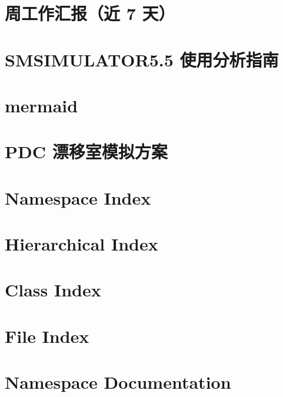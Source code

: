 \let\mypdfximage\pdfximage\def\pdfximage{\immediate\mypdfximage}\documentclass[twoside]{book}
\newcommand{\+}{\discretionary{\mbox{\scriptsize$\hookleftarrow$}}{}{}}
\begin{document}
\chapter{周工作汇报（近 7 天）}
\label{md__home_tbt_workspace_dpol_smsimulator5_85_d_work_WORK_REPORT_WEEK250828}

\chapter{S\+M\+S\+I\+M\+U\+L\+A\+T\+O\+R5.5 使用分析指南}
\label{md__home_tbt_workspace_dpol_smsimulator5_85_doc_smsimulator5_85_analysis_guide}

\chapter{mermaid}
\label{md__home_tbt_workspace_dpol_smsimulator5_85_doc_try_mermaid}

\chapter{P\+DC 漂移室模拟方案}
\label{md__home_tbt_workspace_dpol_smsimulator5_85_sim_deuteron_forunderstanding_pdc_8zh}

\chapter{Namespace Index}

\chapter{Hierarchical Index}

\chapter{Class Index}

\chapter{File Index}

\chapter{Namespace Documentation}





\end{document}
